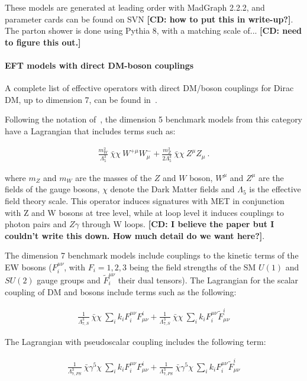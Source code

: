 These models are generated at leading order with MadGraph 2.2.2, and parameter
cards can be found on SVN \textbf{[CD: how to put this in write-up?]}.
The parton shower is done using Pythia 8, with a matching scale of... 
\textbf{[CD: need to figure this out.]}

\paragraph{EFT models with direct DM-boson couplings}

A complete list of effective operators with direct DM/boson couplings for
Dirac DM, up to dimension 7, can be found in~\citep{Cotta:2012nj}. 

Following the notation of~\citep{Carpenter:2012rg}, the dimension 5 benchmark models 
from this category have a Lagrangian that includes terms such as:

\begin{eqnarray}
\frac{m_W^2}{\Lambda_5^3} ~\bar{\chi} \chi ~W^{+ \mu} W^{-}_\mu
+ \frac{m_Z^2}{2 \Lambda_5^3} ~ \bar{\chi} \chi ~ Z^\mu Z_\mu ~.
\end{eqnarray}
 
where $m_Z$ and $m_W$ are the masses of the $Z$ and $W$ boson, $W^{\mu}$ and $Z^{\mu}$
are the fields of the gauge bosons, $\chi$ denote the Dark Matter fields 
and $\Lambda_5$ is the effective field theory scale. This operator 
induces signatures with MET in conjunction with Z and W bosons at tree level,
while at loop level it induces couplings to photon pairs and $Z \gamma$ through W loops. 
\textbf{[CD: I believe the paper but I couldn't write this down. How much detail do we want here?]}. 

The dimension 7 benchmark models include couplings to the kinetic
terms of the EW bosons ($F^{\mu\nu}_i$, with $F_i=1,2,3$ being the field strengths
of the SM $U(1)$ and $SU(2)$ gauge groups and $\tilde F^{\mu\nu}_i$ their dual tensors). 
The Lagrangian for the scalar coupling
of DM and bosons include terms such as the following:

\begin{eqnarray}
\frac{1}{\Lambda_{7,S}^3} ~\bar{\chi} \chi ~ \sum_i k_i  F_i^{\mu \nu} F^i_{\mu \nu} + 
\frac{1}{\Lambda_{7,S}^3} ~\bar{\chi} \chi ~ \sum_i k_i  F_i^{\mu \nu} \tilde F^i_{\mu \nu}
\end{eqnarray}

The Lagrangian with pseudoscalar coupling includes the following term:

\begin{eqnarray}
\frac{1}{\Lambda_{7,PS}^3} ~\bar{\chi} \gamma^5 \chi ~ \sum_i k_i  F_i^{\mu \nu} F^i_{\mu \nu} +
\frac{1}{\Lambda_{7,PS}^3} ~\bar{\chi} \gamma^5 \chi ~ \sum_i k_i  F_i^{\mu \nu} \tilde F^i_{\mu \nu}
\end{eqnarray}

